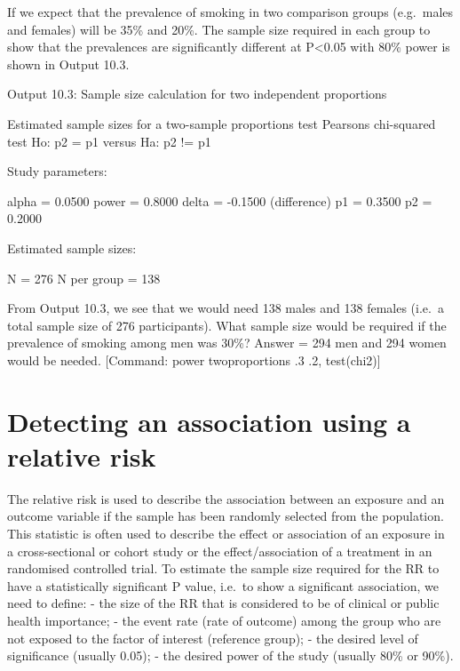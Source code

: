 \documentclass[
]{memoir}
\newenvironment{Shaded}{\begin{snugshade}}{\end{snugshade}}
\newcommand{\NormalTok}[1]{#1}
\begin{document}
If we expect that the prevalence of smoking in two comparison groups (e.g.~males and females) will be 35\% and 20\%. The sample size required in each group to show that the prevalences are significantly different at P\textless0.05 with 80\% power is shown in Output 10.3.

Output 10.3: Sample size calculation for two independent proportions

\begin{Shaded}
\begin{Highlighting}[]
\NormalTok{Estimated sample sizes for a two{-}sample proportions test}
\NormalTok{Pearson\textquotesingle{}s chi{-}squared test }
\NormalTok{Ho: p2 = p1  versus  Ha: p2 != p1}

\NormalTok{Study parameters:}

\NormalTok{        alpha =    0.0500}
\NormalTok{        power =    0.8000}
\NormalTok{        delta =   {-}0.1500  (difference)}
\NormalTok{           p1 =    0.3500}
\NormalTok{           p2 =    0.2000}

\NormalTok{Estimated sample sizes:}

\NormalTok{            N =       276}
\NormalTok{  N per group =       138}
\end{Highlighting}
\end{Shaded}

From Output 10.3, we see that we would need 138 males and 138 females (i.e.~a total sample size of 276 participants).
What sample size would be required if the prevalence of smoking among men was 30\%?
Answer = 294 men and 294 women would be needed.
{[}Command: power twoproportions .3 .2, test(chi2){]}

\hypertarget{detecting-an-association-using-a-relative-risk}{%
\section{Detecting an association using a relative risk}\label{detecting-an-association-using-a-relative-risk}}

The relative risk is used to describe the association between an exposure and an outcome variable if the sample has been randomly selected from the population. This statistic is often used to describe the effect or association of an exposure in a cross-sectional or cohort study or the effect/association of a treatment in an randomised controlled trial. To estimate the sample size required for the RR to have a statistically significant P value, i.e.~to show a significant association, we need to define:
- the size of the RR that is considered to be of clinical or public health importance;
- the event rate (rate of outcome) among the group who are not exposed to the factor of interest (reference group);
- the desired level of significance (usually 0.05);
- the desired power of the study (usually 80\% or 90\%).
\end{document}
